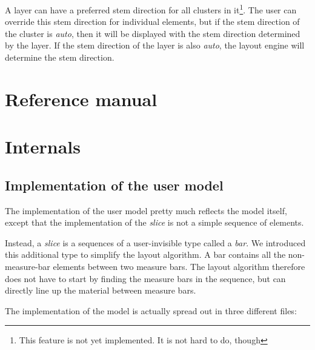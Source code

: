 \documentclass[11pt]{book}
\def\unimp#1{\footnote{This feature is not yet implemented.  #1}}
\def\inputtex#1{}
\begin{document}
A layer can have a preferred stem direction for all clusters in
it\unimp{It is not hard to do, though}.  The user can override this
stem direction for individual elements, but if the stem direction of
the cluster is \emph{auto}, then it will
be displayed with the stem direction determined by the layer.  If the
stem direction of the layer is also \emph{auto}, the layout engine
will determine the stem direction. 

\part{Reference manual}
\inputtex{model.tex}
\inputtex{commands.tex}

\part{Internals}

\chapter{Implementation of the user model}

The implementation of the user model pretty much reflects the model
itself, except that the implementation of the \emph{slice} is not a
simple sequence of elements.

Instead, a \emph{slice} is a sequences of a user-invisible type called
a \emph{bar}.  We introduced this additional type to simplify the
layout algorithm.  A bar contains all the non-measure-bar elements
between two measure bars.  The layout algorithm therefore does not
have to start by finding the measure bars in the sequence, but can
directly line up the material between measure bars.

The implementation of the model is actually spread out in three
different files:
\end{document}
